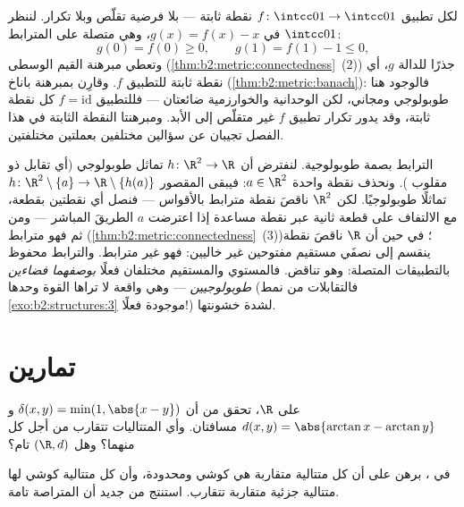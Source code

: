 \begin{example}\label{ex:b2:metric:ivtfixed}
لكل تطبيق  $f \colon \intcc01 \to \intcc01$ نقطة
ثابتة --- بلا فرضية تقلّص وبلا تكرار. لننظر في
$g(x) = f(x) - x$، وهي متصلة على المترابط $\intcc01$:
\[
g(0) = f(0) \geq 0,
\qquad
g(1) = f(1) - 1 \leq 0 ,
\]
وتعطي مبرهنة القيم الوسطى
(\cref{thm:b2:metric:connectedness}~(2)) جذرًا للدالة
$g$، أي نقطة ثابتة للتطبيق $f$. وقارِن بمبرهنة باناخ
(\cref{thm:b2:metric:banach}): فالوجود هنا طوبولوجي
ومجاني، لكن الوحدانية والخوارزمية ضائعتان --- فللتطبيق $f =
\mathrm{id}$ كل نقطة ثابتة، وقد يدور تكرار تطبيق $f$
غير متقلّص إلى الأبد. ومبرهنتا النقطة الثابتة في هذا الفصل
تجيبان عن سؤالين مختلفين بعملتين
مختلفتين.
\end{example}

\begin{example}\label{ex:b2:metric:rnotr2}
الترابط بصمة طوبولوجية. لنفترض أن $h \colon
\R^2 \to \R$ تماثل طوبولوجي (أي تقابل  ذو مقلوب
). ونحذف نقطة واحدة $a \in \R^2$: فيبقى
المقصور $h \colon \R^2\setminus\{a\} \to
\R\setminus\{h(a)\}$ تماثلًا طوبولوجيًا. لكن $\R^2$ ناقصَ
نقطة مترابط بالأقواس --- فنصل أي نقطتين بقطعة،
مع الالتفاف على قطعة ثانية عبر نقطة مساعدة إذا
اعترضت $a$ الطريقَ المباشر --- ومن ثم فهو مترابط
(\cref{thm:b2:metric:connectedness}~(3))؛ في حين أن $\R$ ناقصَ
نقطة ينقسم إلى نصفَي مستقيم مفتوحين غير خاليين: فهو غير مترابط.
والترابط محفوظ بالتطبيقات المتصلة: وهو تناقض.
فالمستوي والمستقيم مختلفان فعلًا \emph{بوصفهما فضاءين
طوبولوجيين} --- وهي واقعة لا تراها القوة وحدها
(فالتقابلات من نمط \cref{exo:b2:structures:3} موجودة فعلًا!) لشدة
خشونتها.
\end{example}

\section{تمارين}

\begin{exercise}[$\star$]\label{exo:b2:metric:1}
على $\R$، تحقق من أن $\delta(x, y) = \min(1, \abs{x - y})$ و
$d(x,y) = \abs{\arctan x - \arctan y}$ مسافتان. وأي المتتاليات تتقارب من أجل كل منهما؟ وهل $(\R, d)$ تام؟
\end{exercise}

\begin{exercise}[$\star$]\label{exo:b2:metric:2}
في ، برهن على أن كل متتالية متقاربة هي كوشي
ومحدودة، وأن كل متتالية كوشي لها متتالية جزئية متقاربة
تتقارب. استنتج من جديد أن  المتراصة تامة.
\end{exercise}

